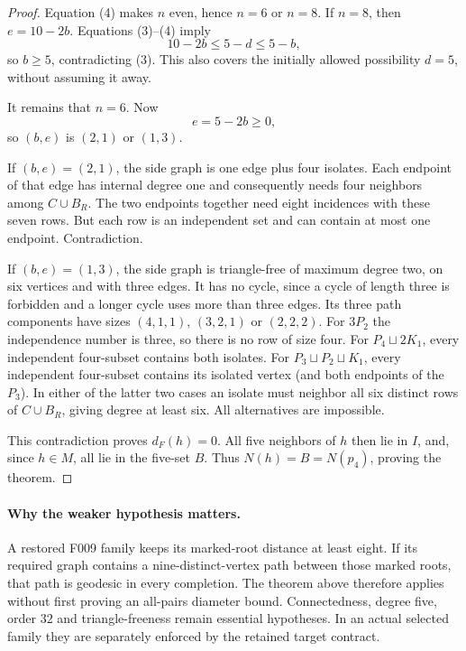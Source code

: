 \documentclass[11pt]{article}
\begin{document}
\begin{proof}
Equation (4) makes $n$ even, hence $n=6$ or $n=8$.
If $n=8$, then $e=10-2b$. Equations (3)--(4) imply
\[
 10-2b\leq5-d\leq5-b,
\]
so $b\geq5$, contradicting (3). This also covers the initially
allowed possibility $d=5$, without assuming it away.

It remains that $n=6$. Now
\[
 e=5-2b\geq0,
\]
so $(b,e)$ is $(2,1)$ or $(1,3)$.

If $(b,e)=(2,1)$, the side graph is one edge plus four isolates.
Each endpoint of that edge has internal degree one and consequently
needs four neighbors among $C\cup B_R$. The two endpoints together
need eight incidences with these seven rows. But each row is an
independent set and can contain at most one endpoint. Contradiction.

If $(b,e)=(1,3)$, the side graph is triangle-free of maximum degree
two, on six vertices and with three edges. It has no cycle, since
a cycle of length three is forbidden and a longer cycle uses more
than three edges. Its three path components have sizes
$(4,1,1)$, $(3,2,1)$ or $(2,2,2)$.
For $3P_2$ the independence number is three, so there is no row of
size four. For $P_4\sqcup2K_1$, every independent four-subset
contains both isolates. For $P_3\sqcup P_2\sqcup K_1$, every
independent four-subset contains its isolated vertex (and both
endpoints of the $P_3$). In either of the latter two cases an
isolate must neighbor all six distinct rows of $C\cup B_R$, giving
degree at least six. All alternatives are impossible.

This contradiction proves $d_F(h)=0$. All five neighbors of $h$
then lie in $I$, and, since $h\in M$, all lie in the five-set $B$.
Thus $N(h)=B=N(p_4)$, proving the theorem.
\end{proof}

\paragraph{Why the weaker hypothesis matters.}
A restored F009 family keeps its marked-root distance at least eight.
If its required graph contains a nine-distinct-vertex path between
those marked roots, that path is geodesic in every completion.
The theorem above therefore applies without first proving an all-pairs
diameter bound. Connectedness, degree five, order $32$ and
triangle-freeness remain essential hypotheses. In an actual selected
family they are separately enforced by the retained target contract.
\end{document}
